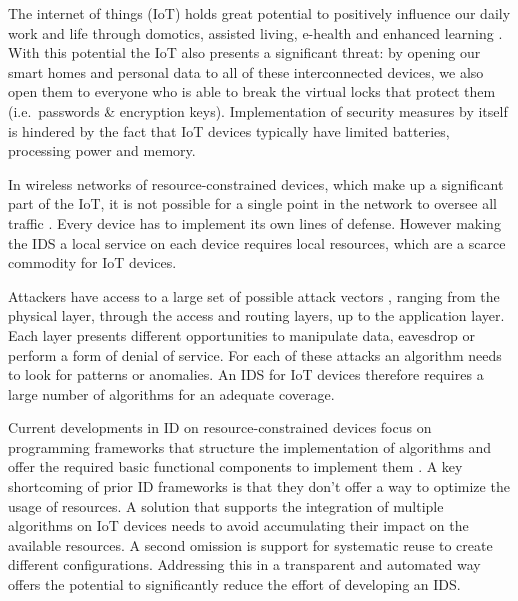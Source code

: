 \documentclass[conference]{IEEEtran}
\begin{document}

The internet of things (IoT) holds great potential to positively influence our
daily work and life through domotics, assisted living, e-health and enhanced
learning \cite{atzori2010internet}. With this potential the IoT also presents a
significant threat: by opening our smart homes and personal data to all of
these interconnected devices, we also open them to everyone who is able to
break the virtual locks that protect them (i.e.\ passwords \& encryption keys).
Implementation of security measures by itself is hindered by the fact that IoT
devices typically have limited batteries, processing power and memory.


In wireless networks of resource-constrained devices, which make up a
significant part of the IoT, it is not possible for a single point in the
network to oversee all traffic \cite{mishra2004intrusion}. Every device has to
implement its own lines of defense. However making the IDS a local service on
each device requires local resources, which are a scarce commodity for IoT
devices.

Attackers have access to a large set of possible attack vectors
\cite{aschenbruck2012security}, ranging from the physical layer, through the
access and routing layers, up to the application layer. Each layer presents
different opportunities to manipulate data, eavesdrop or perform a form of
denial of service. For each of these attacks an algorithm needs to look for
patterns or anomalies. An IDS for IoT devices therefore requires a large number
of algorithms for an adequate coverage.


Current developments in ID on resource-constrained devices focus on programming
frameworks that structure the implementation of algorithms \cite{valero2012di}
and offer the required basic functional components to implement them
\cite{krontiris2008lidea}. A key shortcoming of prior ID frameworks is that
they don't offer a way to optimize the usage of resources. A solution that
supports the integration of multiple algorithms on IoT devices needs to avoid
accumulating their impact on the available resources. A second omission is
support for systematic reuse to create different configurations. Addressing
this in a transparent and automated way offers the potential to significantly
reduce the effort of developing an IDS.

\end{document}
